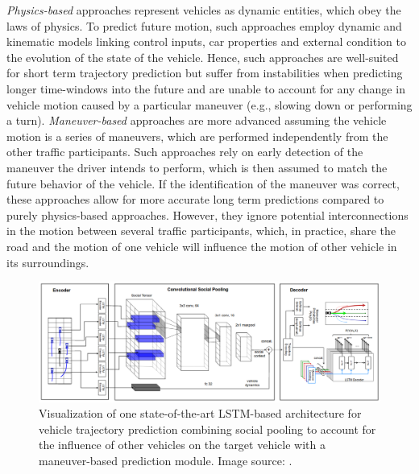 \emph{Physics-based} approaches represent vehicles as dynamic entities, which obey the laws of physics.
To predict future motion, such approaches employ dynamic and kinematic models linking control inputs, car properties and external condition to the evolution of the state of the vehicle.
Hence, such approaches are well-suited for short term trajectory prediction but suffer from instabilities when predicting longer time-windows into the future and are unable to account for any change in vehicle motion caused by a particular maneuver (e.g., slowing down or performing a turn). 
\emph{Maneuver-based} approaches are more advanced assuming the vehicle motion is a series  of maneuvers, which are performed independently from the other traffic participants.
Such approaches rely on early detection of the maneuver the driver intends to perform, which is then assumed to match the future behavior of the vehicle.
If the identification of the maneuver was correct, these approaches allow for more accurate long term predictions compared to purely physics-based approaches.
However, they ignore potential interconnections in the motion between several traffic participants, which, in practice, share the road and the motion of one vehicle will influence the motion of other vehicle in its surroundings.

\begin{figure}[t!]
    \centering
    \includegraphics[width=0.95\linewidth]{imgs/deo_lstm_prediction_arch.png}
    \caption{Visualization of one state-of-the-art \ac{LSTM}-based architecture for vehicle trajectory prediction combining social pooling to account for the influence of other vehicles on the target vehicle with a maneuver-based prediction module. Image source: \textcite{Deo2018a}.}
    \label{fig:deo_lstm_prediction_arch}
\end{figure}

